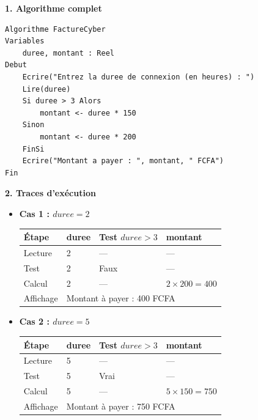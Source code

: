 \documentclass[11pt]{article}
\begin{document}
\begin{corrige}
\textbf{1. Algorithme complet}
\begin{lstlisting}
Algorithme FactureCyber
Variables
    duree, montant : Reel
Debut
    Ecrire("Entrez la duree de connexion (en heures) : ")
    Lire(duree)
    Si duree > 3 Alors
        montant <- duree * 150
    Sinon
        montant <- duree * 200
    FinSi
    Ecrire("Montant a payer : ", montant, " FCFA")
Fin
\end{lstlisting}

\textbf{2. Traces d'exécution}
\begin{itemize}
\item \textbf{Cas 1 : $duree = 2$}
\begin{center}
\begin{tabularx}{\linewidth}{|l|X|X|X|}
\hline
\rowcolor{popblueL} \textbf{Étape} & \textbf{duree} & \textbf{Test $duree>3$} & \textbf{montant} \\
\hline
Lecture & 2 & --- & --- \\
\hline
Test & 2 & Faux & --- \\
\hline
Calcul & 2 & --- & $2 \times 200 = 400$ \\
\hline
Affichage & \multicolumn{3}{X|}{Montant à payer : 400 FCFA} \\
\hline
\end{tabularx}
\end{center}

\item \textbf{Cas 2 : $duree = 5$}
\begin{center}
\begin{tabularx}{\linewidth}{|l|X|X|X|}
\hline
\rowcolor{popblueL} \textbf{Étape} & \textbf{duree} & \textbf{Test $duree>3$} & \textbf{montant} \\
\hline
Lecture & 5 & --- & --- \\
\hline
Test & 5 & Vrai & --- \\
\hline
Calcul & 5 & --- & $5 \times 150 = 750$ \\
\hline
Affichage & \multicolumn{3}{X|}{Montant à payer : 750 FCFA} \\
\hline
\end{tabularx}
\end{center}
\end{itemize}


\end{corrige}
\end{document}
